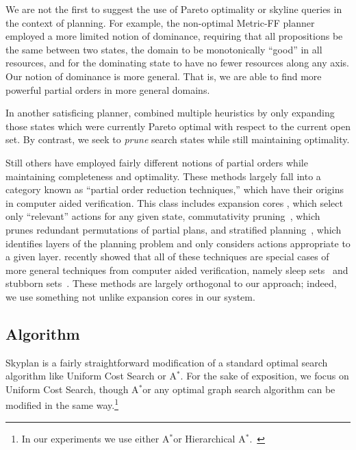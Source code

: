 \documentclass[letterpaper]{article}
\theoremstyle{plain} \newtheorem{theorem}{Theorem} \newtheorem{proposition}{Proposition} \newtheorem{lemma}{Lemma}
\theoremstyle{definition} \newtheorem{definition}{Definition} \newtheorem{conjecture}{Conjecture} \newtheorem*{example}{Example}
\theoremstyle{remark} \newtheorem*{remark}{Remark} \newtheorem*{note}{Note} \newtheorem{case}{Case}
\newcommand{\Astar}{A$^*$}
\begin{document}
We are not the first to suggest the use of Pareto optimality or
skyline queries in the context of planning. For example, the
non-optimal Metric-FF planner~\citep{hoffmann2003metric} employed
a more limited notion of dominance, requiring that all propositions
be the same between two states, the domain to be monotonically
``good'' in all resources, and for the dominating state to have no
fewer resources along any axis. Our notion of dominance is more
general. That is, we are able to find more powerful partial orders
in more general domains.

In another satisficing planner, \citet{roger2010more} combined
multiple heuristics by only expanding those states which were
currently Pareto optimal with respect to the current open set.  By
contrast, we seek to \textit{prune} search states while still
maintaining optimality.

Still others have employed fairly different notions of partial
orders while maintaining completeness and optimality. These methods
largely fall into a category known as ``partial order reduction
techniques,'' which have their origins in computer aided verification.
This class includes expansion cores \citep{chen09completeness,
xu11theory}, which select only ``relevant'' actions for any given
state, commutativity pruning~\citep{geffner2000admissible}, which
prunes redundant permutations of partial plans, and stratified
planning~\citep{chen2009stratified}, which identifies layers of the
planning problem and only considers actions appropriate to a given
layer. \citet{wehrle2012partial} recently showed that all of these
techniques are special cases of more general techniques from computer
aided verification, namely sleep sets~\citep{godefroid96partial}
and stubborn sets~\citep{valmari92stubborn}. These methods are
largely orthogonal to our approach; indeed, we use something not
unlike expansion cores in our system.


\subsection{Algorithm}

Skyplan is a fairly straightforward modification of a standard
optimal search algorithm like Uniform Cost Search or \Astar. For
the sake of exposition, we focus on Uniform Cost Search, though
\Astar or any optimal graph search algorithm can be modified in the
same way.\footnote{In our experiments we use either \Astar or
Hierarchical \Astar.~\citep{holte1996hierarchical}}
\end{document}
